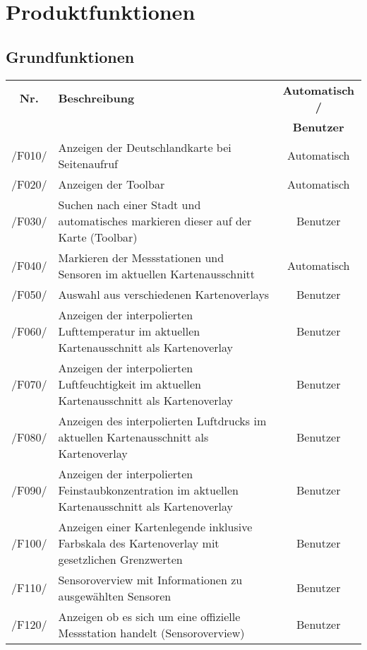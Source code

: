 \clearpage
\section{Produktfunktionen}
\subsection{Grundfunktionen}
\begin{tabularx}{\textwidth}{| c | X | c |}
\hline
        \textbf{Nr.} & 
        \textbf{Beschreibung} & 
        \textbf{Automatisch /} \\
        & & \textbf{Benutzer} \\
        \hline
        /F010/ & Anzeigen der Deutschlandkarte bei Seitenaufruf & Automatisch \\
        \hline
        /F020/ & Anzeigen der Toolbar & Automatisch \\
        \hline
        /F030/ & Suchen nach einer Stadt und automatisches markieren dieser auf der Karte (Toolbar) & Benutzer \\
        \hline
        /F040/ & Markieren der Messstationen und Sensoren im aktuellen Kartenausschnitt & Automatisch \\
        \hline
        /F050/ & Auswahl aus verschiedenen Kartenoverlays & Benutzer \\
        \hline
        /F060/ & Anzeigen der interpolierten Lufttemperatur im aktuellen Kartenausschnitt als Kartenoverlay & Benutzer \\
        \hline
        /F070/ & Anzeigen der interpolierten Luftfeuchtigkeit im aktuellen Kartenausschnitt als Kartenoverlay & Benutzer \\
        \hline
        /F080/ & Anzeigen des interpolierten Luftdrucks im aktuellen Kartenausschnitt als Kartenoverlay & Benutzer \\
        \hline
        /F090/ & Anzeigen der interpolierten Feinstaubkonzentration im aktuellen Kartenausschnitt als Kartenoverlay & Benutzer \\
        \hline
        /F100/ & Anzeigen einer Kartenlegende inklusive Farbskala des Kartenoverlay mit gesetzlichen Grenzwerten & Benutzer \\
        \hline
        /F110/ & Sensoroverview mit Informationen zu ausgewählten Sensoren & Benutzer \\
        \hline
        /F120/ & Anzeigen ob es sich um eine offizielle Messstation handelt (Sensoroverview) & Benutzer \\

\end{tabularx}
